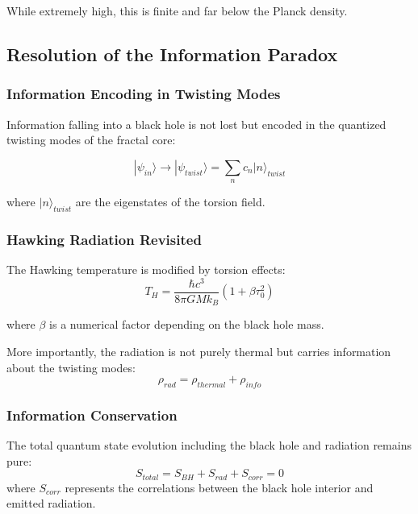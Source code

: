 While extremely high, this is finite and far below the Planck density.

\subsection{Resolution of the Information Paradox}

\subsubsection{Information Encoding in Twisting Modes}

Information falling into a black hole is not lost but encoded in the quantized twisting modes of the fractal core:

\begin{equation}
    |\psi_{in}\rangle \to |\psi_{twist}\rangle = \sum_n c_n |n\rangle_{twist}
\end{equation}

where $|n\rangle_{twist}$ are the eigenstates of the torsion field.

\subsubsection{Hawking Radiation Revisited}

The Hawking temperature is modified by torsion effects:
\begin{equation}
    T_H = \frac{\hbar c^3}{8\pi GMk_B}(1 + \beta\tau_0^2)
\end{equation}

where $\beta$ is a numerical factor depending on the black hole mass.

More importantly, the radiation is not purely thermal but carries information about the twisting modes:
\begin{equation}
    \rho_{rad} = \rho_{thermal} + \rho_{info}
\end{equation}

\subsubsection{Information Conservation}

\begin{theorem}
The total quantum state evolution including the black hole and radiation remains pure:
\begin{equation}
    S_{total} = S_{BH} + S_{rad} + S_{corr} = 0
\end{equation}
where $S_{corr}$ represents the correlations between the black hole interior and emitted radiation.
\end{theorem}

